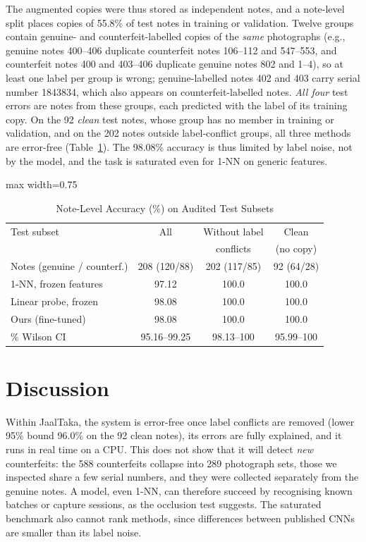 \documentclass[journal,onecolumn]{IEEEtran}
\begin{document}
The augmented copies were thus stored as independent notes, and a note-level split
places copies of 55.8\% of test notes in training or validation. Twelve groups contain
genuine- and counterfeit-labelled copies of the \emph{same} photographs (e.g., genuine
notes 400--406 duplicate counterfeit notes 106--112 and 547--553, and counterfeit notes
400 and 403--406 duplicate genuine notes 802 and 1--4), so at least one label
per group is wrong; genuine-labelled notes 402 and 403 carry serial number 1843834,
which also appears on counterfeit-labelled notes. \emph{All four} test errors are notes
from these groups, each predicted with the label of its training copy. On the 92
\emph{clean} test notes, whose group has no member in training or validation, and on the
202 notes outside label-conflict groups, all three methods are error-free
(Table~\ref{tab:clean}). The 98.08\% accuracy is thus limited by label noise, not by the
model, and the task is saturated even for 1-NN on generic features.

\begin{table}[!htbp]
\caption{Note-Level Accuracy (\%) on Audited Test Subsets}
\label{tab:clean}
\centering
\footnotesize
\setlength{\tabcolsep}{4pt}
\begin{adjustbox}{max width=0.75\linewidth}
\begin{tabular}{@{}lccc@{}}
\toprule
Test subset & All & Without label & Clean \\
& & conflicts & (no copy) \\
\midrule
Notes (genuine / counterf.) & 208 (120/88) & 202 (117/85) & 92 (64/28) \\
\midrule
1-NN, frozen features & 97.12 & 100.0 & 100.0 \\
Linear probe, frozen & 98.08 & 100.0 & 100.0 \\
Ours (fine-tuned) & 98.08 & 100.0 & 100.0 \\
\quad 95\% Wilson CI & 95.16--99.25 & 98.13--100 & 95.99--100 \\
\bottomrule
\end{tabular}
\end{adjustbox}
\end{table}

\section{Discussion}
\label{sec:discussion}

Within JaalTaka, the system is error-free once label conflicts are removed (lower 95\%
bound 96.0\% on the 92 clean notes), its errors are fully explained, and it runs in real
time on a CPU. This does not show that it will detect \emph{new} counterfeits: the 588
counterfeits collapse into 289 photograph sets, those we inspected share a few serial
numbers, and they were collected separately from the genuine notes. A model, even 1-NN,
can therefore succeed by recognising known batches or capture sessions, as the occlusion
test suggests. The saturated benchmark also cannot rank methods, since differences
between published CNNs are smaller than its label noise.
\end{document}
